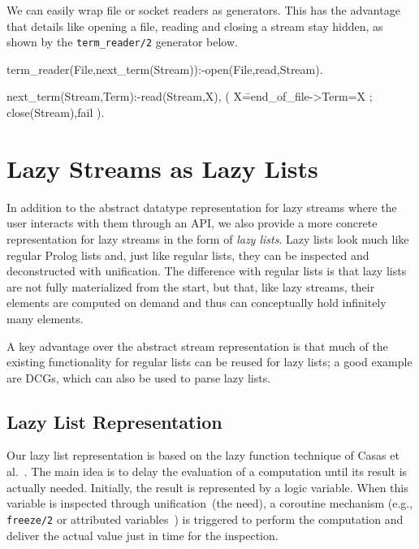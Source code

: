 \documentclass{new_tlp}
\begin{document}
We can easily wrap file or socket readers as generators. This has the
advantage that details like opening a file, reading and
closing a stream stay hidden, as shown by the 
{\tt term\_reader/2} generator below.

\begin{code}
term_reader(File,next_term(Stream)):-open(File,read,Stream).

next_term(Stream,Term):-read(Stream,X),
  ( X\==end_of_file->Term=X
  ; close(Stream),fail
  ).
\end{code}


\section{Lazy Streams as Lazy Lists}\label{ll}

In addition to the abstract datatype representation for lazy streams where the
user interacts with them through an API, we also provide a more concrete
representation for lazy streams in the form of {\em lazy lists}. Lazy lists
look much like regular Prolog lists and, just like regular lists, they can be
inspected and deconstructed with unification. The difference with regular lists
is that lazy lists are not fully materialized from the start, but that, like
lazy streams, their elements are computed on demand and thus can conceptually
hold infinitely many elements. 

A key advantage over the abstract stream representation is that much of the
existing functionality for regular lists can be reused for lazy lists; a good
example are DCGs, which can also be used to parse lazy lists.

\subsection{Lazy List Representation}

Our lazy list representation is based on the lazy function technique of Casas
et al.~\cite{lazyCiao,casas2005functional}. The main idea is to delay the
evaluation of a computation until its result is actually needed. Initially, the
result is represented by a logic variable. When this variable is inspected
through unification~(the need), a coroutine mechanism (e.g., {\tt freeze/2} or
attributed variables~\cite{holz92}) is triggered to perform the computation and
deliver the actual value just in time for the inspection.
\end{document}
